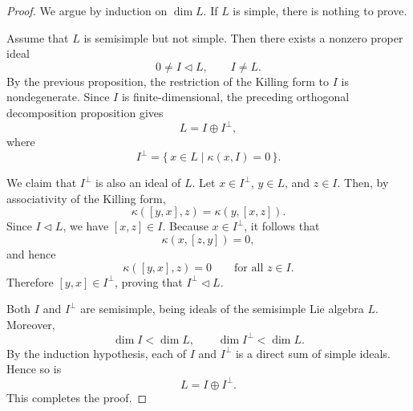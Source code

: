 \begin{proof}
    We argue by induction on $\dim L$. If $L$ is simple, there is nothing to prove.

    Assume that $L$ is semisimple but not simple. Then there exists a nonzero proper ideal
    \[
        0\ne I\triangleleft L,\qquad I\ne L.
    \]
    By the previous proposition, the restriction of the Killing form to $I$ is nondegenerate.
    Since $I$ is finite-dimensional, the preceding orthogonal decomposition proposition gives
    \[
        L=I\oplus I^\perp,
    \]
    where
    \[
        I^\perp=\{\,x\in L\mid \kappa(x,I)=0\,\}.
    \]

    We claim that $I^\perp$ is also an ideal of $L$. Let $x\in I^\perp$, $y\in L$, and $z\in I$.
    Then, by associativity of the Killing form,
    \[
        \kappa([y,x],z)=\kappa(y,[x,z]).
    \]
    Since $I\triangleleft L$, we have $[x,z]\in I$. Because $x\in I^\perp$, it follows that
    \[
        \kappa(x,[z,y])=0,
    \]
    and hence
    \[
        \kappa([y,x],z)=0
        \qquad\text{for all } z\in I.
    \]
    Therefore $[y,x]\in I^\perp$, proving that $I^\perp\triangleleft L$.

    Both $I$ and $I^\perp$ are semisimple, being ideals of the semisimple Lie algebra $L$.
    Moreover,
    \[
        \dim I<\dim L,\qquad \dim I^\perp<\dim L.
    \]
    By the induction hypothesis, each of $I$ and $I^\perp$ is a direct sum of simple ideals.
    Hence so is
    \[
        L=I\oplus I^\perp.
    \]
    This completes the proof.
\end{proof}

